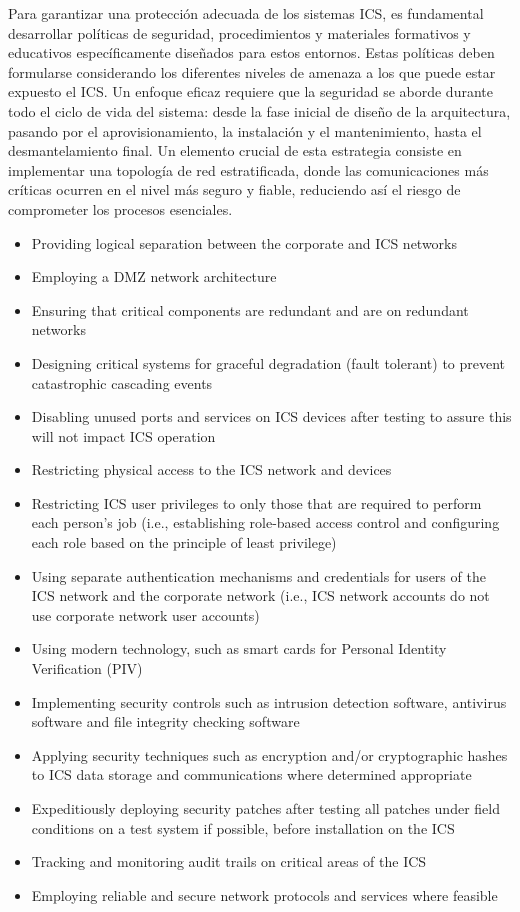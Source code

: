 Para garantizar una protección adecuada de los sistemas ICS, es fundamental desarrollar políticas de seguridad, procedimientos y materiales formativos y educativos específicamente diseñados para estos entornos. Estas políticas deben formularse considerando los diferentes niveles de amenaza a los que puede estar expuesto el ICS. Un enfoque eficaz requiere que la seguridad se aborde durante todo el ciclo de vida del sistema: desde la fase inicial de diseño de la arquitectura, pasando por el aprovisionamiento, la instalación y el mantenimiento, hasta el desmantelamiento final. Un elemento crucial de esta estrategia consiste en implementar una topología de red estratificada, donde las comunicaciones más críticas ocurren en el nivel más seguro y fiable, reduciendo así el riesgo de comprometer los procesos esenciales.
\begin{itemize}
	\item Providing logical separation between the corporate and ICS networks
	
	\item Employing a DMZ network architecture
	\item Ensuring that critical components are redundant and are on redundant networks
	\item Designing critical systems for graceful degradation (fault tolerant) to prevent catastrophic cascading events
	\item Disabling unused ports and services on ICS devices after testing to assure this will not impact ICS operation
	\item Restricting physical access to the ICS network and devices
	\item Restricting ICS user privileges to only those that are required to perform each person’s job (i.e., establishing role-based access control and configuring each role based on the principle of least privilege)
	\item Using separate authentication mechanisms and credentials for users of the ICS network and the corporate network (i.e., ICS network accounts do not use corporate network user accounts)
	\item Using modern technology, such as smart cards for Personal Identity Verification (PIV)
	\item Implementing security controls such as intrusion detection software, antivirus software and file integrity checking software
	\item Applying security techniques such as encryption and/or cryptographic hashes to ICS data storage and communications where determined appropriate
	\item Expeditiously deploying security patches after testing all patches under field conditions on a test system if possible, before installation on the ICS
	\item Tracking and monitoring audit trails on critical areas of the ICS
	\item Employing reliable and secure network protocols and services where feasible
\end{itemize}

